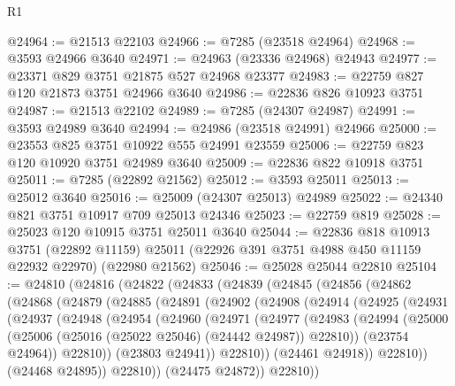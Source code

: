 \begin{lexlean}{R1}
\begin{coremodule}
@24964 := @21513 @22103
@24966 := @7285 (@23518 @24964)
@24968 := @3593 @24966 @3640
@24971 := @24963 (@23336 @24968) @24943
@24977 := @23371 @829 @3751 @21875 @527 @24968 @23377
@24983 := @22759 @827 @120 @21873 @3751 @24966 @3640
@24986 := @22836 @826 @10923 @3751
@24987 := @21513 @22102
@24989 := @7285 (@24307 @24987)
@24991 := @3593 @24989 @3640
@24994 := @24986 (@23518 @24991) @24966
@25000 := @23553 @825 @3751 @10922 @555 @24991 @23559
@25006 := @22759 @823 @120 @10920 @3751 @24989 @3640
@25009 := @22836 @822 @10918 @3751
@25011 := @7285 (@22892 @21562)
@25012 := @3593 @25011
@25013 := @25012 @3640
@25016 := @25009 (@24307 @25013) @24989
@25022 := @24340 @821 @3751 @10917 @709 @25013 @24346
@25023 := @22759 @819
@25028 := @25023 @120 @10915 @3751 @25011 @3640
@25044 := @22836
    @818
    @10913
    @3751
    (@22892 @11159)
    @25011
    (@22926 @391 @3751 @4988 @450 @11159 @22932 @22970)
    (@22980 @21562)
@25046 := @25028 @25044 @22810
@25104 := @24810
    (@24816
      (@24822
        (@24833
          (@24839
            (@24845
              (@24856
                (@24862
                  (@24868
                    (@24879
                      (@24885
                        (@24891
                          (@24902
                            (@24908
                              (@24914
                                (@24925
                                  (@24931
                                    (@24937
                                      (@24948
                                        (@24954
                                          (@24960
                                            (@24971
                                              (@24977
                                                (@24983
                                                  (@24994
                                                    (@25000
                                                      (@25006
                                                        (@25016 (@25022 @25046) (@24442 @24987))
                                                        @22810))
                                                    (@23754 @24964))
                                                  @22810))
                                              (@23803 @24941))
                                            @22810))
                                        (@24461 @24918))
                                      @22810))
                                  (@24468 @24895))
                                @22810))
                            (@24475 @24872))
                          @22810))

\end{coremodule}
\end{lexlean}
